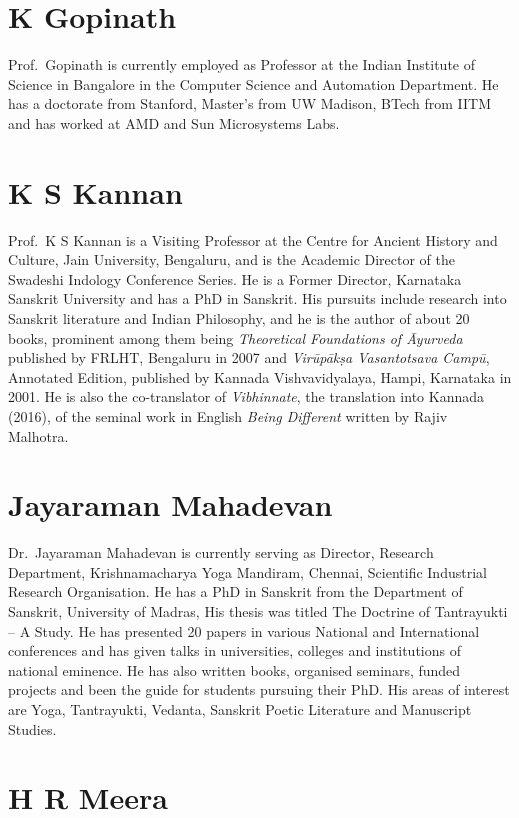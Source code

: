 \section*{K Gopinath}

Prof.~Gopinath is currently employed as Professor at the Indian Institute of Science in Bangalore in the Computer Science and Automation Department. He has a doctorate from Stanford, Master’s from UW Madison, BTech from IITM and has worked at AMD and Sun Microsystems Labs.

\section*{K S Kannan}

Prof.~K S Kannan is a Visiting Professor at the Centre for Ancient History and Culture, Jain University, Bengaluru, and is the Academic Director of the Swadeshi Indology Conference Series. He is a Former Director, Karnataka Sanskrit University and has a PhD in Sanskrit. His pursuits include research into Sanskrit literature and Indian Philosophy, and he is the author of about 20 books, prominent among them being {\sl Theoretical Foundations of Āyurveda} published by FRLHT, Bengaluru in 2007 and {\sl Virūpākṣa Vasantotsava Campū}, Annotated Edition, published by Kannada Vishvavidyalaya, Hampi, Karnataka in 2001. He is also the co-translator of {\sl Vibhinnate}, the translation into Kannada (2016), of the seminal work in English {\sl Being Different} written by Rajiv Malhotra.

\section*{Jayaraman Mahadevan}

Dr.~Jayaraman Mahadevan is currently serving as Director, Research Department, Krishnamacharya Yoga Mandiram, Chennai, Scientific Industrial Research Organisation. He has a PhD in Sanskrit from the Department of Sanskrit, University of Madras, His thesis was titled The Doctrine of Tantrayukti – A Study. He has presented 20 papers in various National and International conferences and has given talks in universities, colleges and institutions of national eminence. He has also written books, organised seminars, funded projects and been the guide for students pursuing their PhD. His areas of interest are Yoga, Tantrayukti, Vedanta, Sanskrit Poetic Literature and Manuscript Studies.

\section*{H R Meera}

